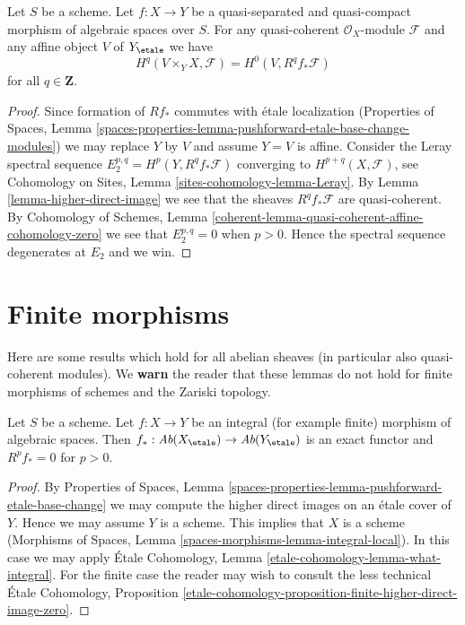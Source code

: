 \begin{lemma}
\label{lemma-quasi-coherence-higher-direct-images-application}
Let $S$ be a scheme. Let $f : X \to Y$ be a quasi-separated and quasi-compact
morphism of algebraic spaces over $S$. For any quasi-coherent
$\mathcal{O}_X$-module $\mathcal{F}$ and any affine object $V$ of
$Y_\etale$ we have
$$
H^q(V \times_Y X, \mathcal{F}) = H^0(V, R^qf_*\mathcal{F})
$$
for all $q \in \mathbf{Z}$.
\end{lemma}

\begin{proof}
Since formation of $Rf_*$ commutes with \'etale localization
(Properties of Spaces, Lemma
\ref{spaces-properties-lemma-pushforward-etale-base-change-modules})
we may replace $Y$ by $V$ and assume $Y = V$ is affine.
Consider the Leray spectral sequence
$E_2^{p, q} = H^p(Y, R^qf_*\mathcal{F})$
converging to $H^{p + q}(X, \mathcal{F})$, see
Cohomology on Sites, Lemma \ref{sites-cohomology-lemma-Leray}.
By Lemma \ref{lemma-higher-direct-image}
we see that the sheaves $R^qf_*\mathcal{F}$ are quasi-coherent. By
Cohomology of Schemes, Lemma
\ref{coherent-lemma-quasi-coherent-affine-cohomology-zero}
we see that $E_2^{p, q} = 0$ when $p > 0$.
Hence the spectral sequence degenerates at $E_2$ and we win.
\end{proof}




\section{Finite morphisms}
\label{section-finite-morphisms}

\noindent
Here are some results which hold for all abelian sheaves
(in particular also quasi-coherent modules).
We {\bf warn} the reader that these lemmas do not hold for
finite morphisms of schemes and the Zariski topology.

\begin{lemma}
\label{lemma-finite-higher-direct-image-zero}
Let $S$ be a scheme. Let $f : X \to Y$ be an integral (for example finite)
morphism of algebraic spaces. Then
$f_* : \textit{Ab}(X_\etale) \to \textit{Ab}(Y_\etale)$
is an exact functor and $R^pf_* = 0$ for $p > 0$.
\end{lemma}

\begin{proof}
By Properties of Spaces, Lemma
\ref{spaces-properties-lemma-pushforward-etale-base-change}
we may compute the higher direct images on an \'etale cover of $Y$.
Hence we may assume $Y$ is a scheme. This implies that
$X$ is a scheme (Morphisms of Spaces, Lemma
\ref{spaces-morphisms-lemma-integral-local}).
In this case we may apply
\'Etale Cohomology, Lemma \ref{etale-cohomology-lemma-what-integral}.
For the finite case the reader may wish to consult the less technical
\'Etale Cohomology, Proposition
\ref{etale-cohomology-proposition-finite-higher-direct-image-zero}.
\end{proof}

